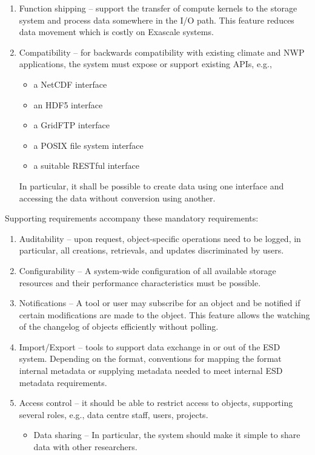 \begin{enumerate}

\item Function shipping -- support the transfer of compute kernels to the storage system and process data somewhere in the I/O path. This feature reduces data movement which is costly on Exascale systems.

\item Compatibility -- for backwards compatibility with existing climate and NWP applications, the system must expose or support existing APIs, e.g.,
\begin{itemize}
\item a NetCDF interface
\item an HDF5 interface %
\item a GridFTP interface
\item a POSIX file system interface
\item a suitable RESTful interface
\end{itemize}
In particular, it shall be possible to create data using one interface and accessing the data without conversion using another.
\end{enumerate}



Supporting requirements accompany these mandatory requirements:
\begin{enumerate}
\item Auditability -- upon request, object-specific operations need to be logged, in particular, all creations, retrievals, and updates discriminated by users.
\item Configurability -- A system-wide configuration of all available storage resources and their performance characteristics must be possible.
\item Notifications -- A tool or user may subscribe for an object and be notified if certain modifications are made to the object. This feature allows the watching of the changelog of objects efficiently without polling.
\item Import/Export -- tools to support data exchange in or out of the ESD system.
Depending on the format, conventions for mapping the format internal metadata or supplying metadata needed to meet internal ESD metadata requirements.
\item Access control -- it should be able to restrict access to objects, supporting several roles, e.g., data centre staff, users, projects.
\begin{itemize}
\item Data sharing -- In particular, the system should make it simple to share data with other researchers.
\end{itemize}
\end{enumerate}



